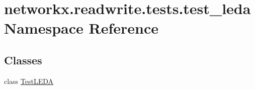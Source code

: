 \hypertarget{namespacenetworkx_1_1readwrite_1_1tests_1_1test__leda}{}\section{networkx.\+readwrite.\+tests.\+test\+\_\+leda Namespace Reference}
\label{namespacenetworkx_1_1readwrite_1_1tests_1_1test__leda}
\subsection*{Classes}
\begin{DoxyCompactItemize}
\item 
class \hyperlink{classnetworkx_1_1readwrite_1_1tests_1_1test__leda_1_1TestLEDA}{Test\+L\+E\+DA}
\end{DoxyCompactItemize}
